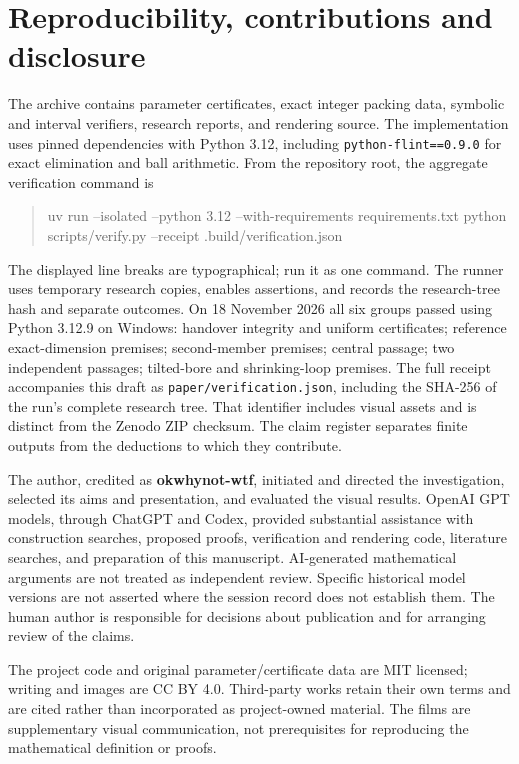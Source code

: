 \section{Reproducibility, contributions and disclosure}\label{sec:repro}
The archive contains parameter certificates, exact integer packing data,
symbolic and interval verifiers, research reports, and rendering source.
The implementation uses pinned dependencies with Python 3.12, including
\texttt{python-flint==0.9.0} for exact elimination and ball arithmetic.
From the repository root, the aggregate verification command is
\begin{quote}\small\ttfamily
uv run --isolated --python 3.12\newline
\hspace*{1em}--with-requirements requirements.txt python scripts/verify.py\newline
\hspace*{1em}--receipt .build/verification.json
\end{quote}
The displayed line breaks are typographical; run it as one command.
The runner uses temporary research copies, enables assertions, and records
the research-tree hash and separate outcomes. On 18 November 2026 all six
groups passed using Python 3.12.9 on Windows: handover integrity and uniform
certificates; reference exact-dimension premises; second-member premises;
central passage; two independent passages; tilted-bore and shrinking-loop
premises. The full receipt accompanies this draft as
\texttt{paper/verification.json}, including the SHA-256 of the run's complete
research tree. That identifier includes visual assets and is distinct from
the Zenodo ZIP checksum. The claim register separates finite outputs from
the deductions to which they contribute.

The author, credited as \textbf{okwhynot-wtf}, initiated and directed the
investigation, selected its aims and presentation, and evaluated the visual
results. OpenAI GPT models, through ChatGPT and Codex, provided substantial
assistance with construction searches, proposed proofs, verification and
rendering code, literature searches, and preparation of this manuscript.
AI-generated mathematical arguments are not treated as independent review.
Specific historical model versions are not asserted where the session record
does not establish them. The human author is responsible for decisions about
publication and for arranging review of the claims.

The project code and original parameter/certificate data are MIT licensed;
writing and images are CC BY 4.0. Third-party works retain their own terms
and are cited rather than incorporated as project-owned material. The films
are supplementary visual communication, not prerequisites for reproducing
the mathematical definition or proofs.
